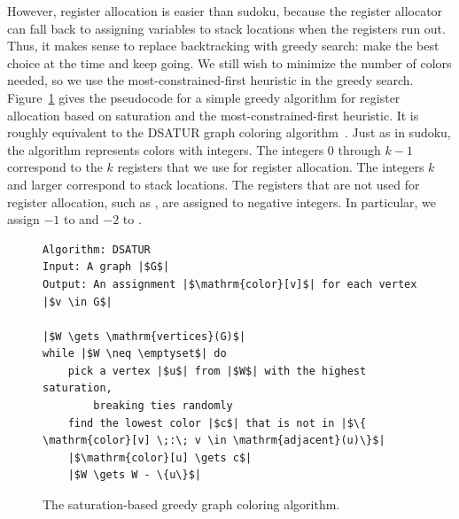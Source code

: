 \documentclass[7x10]{TimesAPriori_MIT}%
\numberwithin{theorem}{chapter}
\numberwithin{definition}{chapter}
\numberwithin{equation}{chapter}
\begin{document}
However, register allocation is easier than sudoku, because the
register allocator can fall back to assigning variables to stack
locations when the registers run out. Thus, it makes sense to replace
backtracking with greedy search: make the best choice at the time and
keep going. We still wish to minimize the number of colors needed, so
we use the most-constrained-first heuristic in the greedy search.
Figure~\ref{fig:satur-algo} gives the pseudocode for a simple greedy
algorithm for register allocation based on saturation and the
most-constrained-first heuristic. It is roughly equivalent to the
DSATUR graph coloring algorithm~\citep{Brelaz:1979eu}.
Just as in sudoku, the algorithm represents colors with integers. The
integers $0$ through $k-1$ correspond to the $k$ registers that we use
for register allocation. The integers $k$ and larger correspond to
stack locations. The registers that are not used for register
allocation, such as , are assigned to negative integers. In
particular, we assign $-1$ to  and $-2$ to .



\begin{figure}[btp]
\begin{tcolorbox}[colback=white]
  \centering
\begin{lstlisting}[basicstyle=\rmfamily,deletekeywords={for,from,with,is,not,in,find},morekeywords={while},columns=fullflexible]
Algorithm: DSATUR
Input: A graph |$G$|
Output: An assignment |$\mathrm{color}[v]$| for each vertex |$v \in G$|

|$W \gets \mathrm{vertices}(G)$|
while |$W \neq \emptyset$| do
    pick a vertex |$u$| from |$W$| with the highest saturation,
        breaking ties randomly
    find the lowest color |$c$| that is not in |$\{ \mathrm{color}[v] \;:\; v \in \mathrm{adjacent}(u)\}$|
    |$\mathrm{color}[u] \gets c$|
    |$W \gets W - \{u\}$|
\end{lstlisting}
\end{tcolorbox}
\caption{The saturation-based greedy graph coloring algorithm.}
  \label{fig:satur-algo}
\end{figure}
\end{document}
